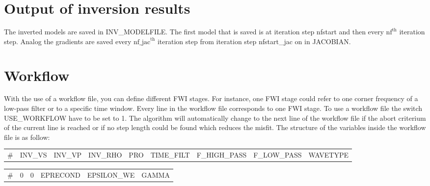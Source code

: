 \section{Output of inversion results}
\label{sec:Output_of_inversion_results_json}
{\color{blue}{\begin{verbatim}
"Output of inverted models" : "comment",
			"INV_MODELFILE" : "model/model_Test",
			"nfstart" : "1",
			"nf" : "1",

"Output of gradients" : "comment",
			"JACOBIAN" : "jacobian/jacobian_Test",
			"nfstart_jac" : "1",
			"nf_jac" : "1",
\end{verbatim}}}

The inverted models are saved in INV\_MODELFILE. The first model that is saved is at iteration step nfstart and then every $\mathrm{nf}^{\mathrm{th}}$ iteration step. Analog the gradients are saved every $\mathrm{nf\_jac}^{\mathrm{th}}$ iteration step from iteration step nfstart\_jac on in JACOBIAN. 

\section{Workflow}
\label{sec:workflow}
{\color{blue}{\begin{verbatim}
"Workflow" : "comment",
			"USE_WORKFLOW" : "1",
			"FILE_WORKFLOW" : "workflow.txt",
\end{verbatim}}}
{\color{red}{\begin{verbatim}
Default values are:
"USE_WORKFLOW" : "0"
\end{verbatim}}}
With the use of a workflow file, you can define different FWI stages. For instance, one FWI stage could refer to one corner frequency of a low-pass filter or to a specific time window. Every line in the workflow file corresponds to one FWI stage. To use a workflow file the switch USE\_WORKFLOW have to be set to 1.  The algorithm will automatically change to the next line of the workflow file if the abort criterium of the current line is reached or if no step length could be found which reduces the misfit. The structure of the variables inside the workflow file is as follow: \\

\noindent
\begin{tabular}{lllllllll}
\# & INV\_VS & INV\_VP & INV\_RHO & PRO & TIME\_FILT & F\_HIGH\_PASS & F\_LOW\_PASS & WAVETYPE\\
\end{tabular}
\begin{tabular}{llllll}
\# &  0 & 0 & EPRECOND & EPSILON\_WE & GAMMA \\
\end{tabular}

